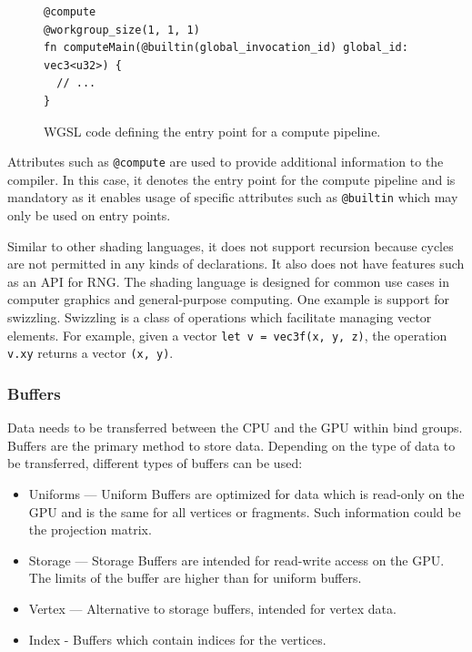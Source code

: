 \begin{figure}[H]
  \begin{lstlisting}[style=wgsl]
@compute
@workgroup_size(1, 1, 1)
fn computeMain(@builtin(global_invocation_id) global_id: vec3<u32>) {
  // ...
}
  \end{lstlisting}
  \caption{\gls{WGSL} code defining the entry point for a compute pipeline.}
  \label{code:computePipelineWgsl}
\end{figure}

Attributes such as \texttt{@compute} are used to provide additional information to the compiler. In this case, it denotes the entry point for the compute pipeline and is mandatory as it enables usage of specific attributes such as \texttt{@builtin} which may only be used on entry points.

Similar to other shading languages, it does not support recursion because cycles are not permitted in any kinds of declarations. It also does not have features such as an \gls{API} for \gls{RNG}. The shading language is designed for common use cases in computer graphics and general-purpose computing. One example is support for swizzling. Swizzling is a class of operations which facilitate managing vector elements. For example, given a vector \texttt{let v = vec3f(x, y, z)}, the operation \texttt{v.xy} returns a vector \texttt{(x, y)}.

\subsubsection{Buffers}

Data needs to be transferred between the CPU and the GPU within bind groups. Buffers are the primary method to store data. Depending on the type of data to be transferred, different types of buffers can be used:

\begin{itemize}
  \item{Uniforms} — Uniform Buffers are optimized for data which is read-only on the GPU and is the same for all vertices or fragments. Such information could be the projection matrix.
  \item{Storage} — Storage Buffers are intended for read-write access on the GPU. The limits of the buffer are higher than for uniform buffers.
  \item{Vertex} — Alternative to storage buffers, intended for vertex data.
  \item{Index} - Buffers which contain indices for the vertices.
\end{itemize}

